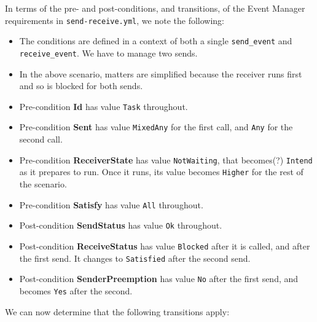 In terms of the pre- and post-conditions, and transitions,
of the Event Manager requirements in \texttt{send-receive.yml},
we note the following:
\begin{itemize}
  \item
    The conditions are defined in a context of both a single
    \texttt{send_event} and \texttt{receive_event}.
    We have to manage two sends.
  \item
    In the above scenario, matters are simplified because the receiver runs
    first and so is blocked for both sends.
  \item
    Pre-condition \textbf{Id} has value \texttt{Task} throughout.
  \item
    Pre-condition \textbf{Sent} has value \texttt{MixedAny} for the first call,
    and \texttt{Any} for the second call.
  \item
    Pre-condition \textbf{ReceiverState} has value \texttt{NotWaiting},
    that becomes(?) \texttt{Intend} as it prepares to run.
    Once it runs, its value becomes \texttt{Higher}
    for the rest of the scenario.
  \item
    Pre-condition \textbf{Satisfy} has value \texttt{All} throughout.
  \item
    Post-condition \textbf{SendStatus} has value \texttt{Ok} throughout.
  \item
    Post-condition \textbf{ReceiveStatus} has value \texttt{Blocked}
    after it is called, and after the first send.
    It changes to \texttt{Satisfied} after the second send.
  \item
    Post-condition \textbf{SenderPreemption} has value \texttt{No}
    after the first send, and becomes \texttt{Yes} after the second.
\end{itemize}

We can now determine that the following transitions apply:
